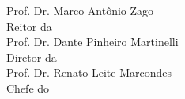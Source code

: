 \newpage
\begin{center}
\vspace*{18cm}
Prof. Dr. Marco Antônio Zago \\
Reitor da \imprimiruniversidade \\
\vspace{20pt}
Prof. Dr. Dante Pinheiro Martinelli  \\
Diretor da \imprimirfaculdade \\
\vspace{20pt}
Prof. Dr. Renato Leite Marcondes \\
Chefe do \imprimirdepartamento
\end{center}